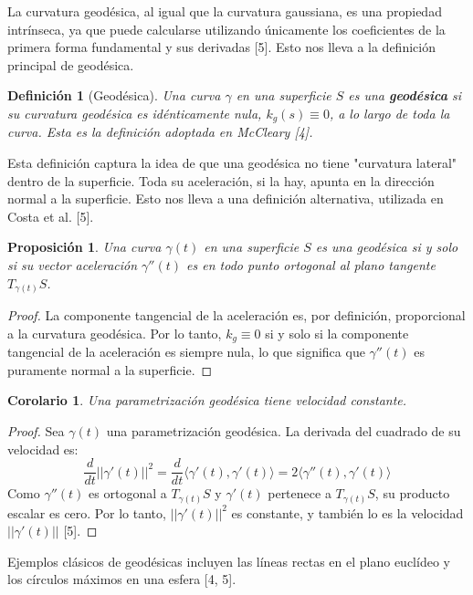 \documentclass[12pt, a4paper]{report}
\theoremstyle{miestilo}
\newtheorem{proposicion}[teorema]{Proposición}
\newtheorem{corolario}[teorema]{Corolario}
\theoremstyle{midefinicion}
\newtheorem{definicion}[teorema]{Definición}
\begin{document}
La curvatura geodésica, al igual que la curvatura gaussiana, es una propiedad intrínseca, ya que puede calcularse utilizando únicamente los coeficientes de la primera forma fundamental y sus derivadas [5]. Esto nos lleva a la definición principal de geodésica.

\begin{definicion}[Geodésica]
Una curva $\gamma$ en una superficie $S$ es una \textbf{geodésica} si su curvatura geodésica es idénticamente nula, $k_g(s) \equiv 0$, a lo largo de toda la curva. Esta es la definición adoptada en McCleary [4].
\end{definicion}

Esta definición captura la idea de que una geodésica no tiene "curvatura lateral" dentro de la superficie. Toda su aceleración, si la hay, apunta en la dirección normal a la superficie. Esto nos lleva a una definición alternativa, utilizada en Costa et al. [5].

\begin{proposicion}
Una curva $\gamma(t)$ en una superficie $S$ es una geodésica si y solo si su vector aceleración $\gamma''(t)$ es en todo punto ortogonal al plano tangente $T_{\gamma(t)}S$.
\end{proposicion}

\begin{proof}
La componente tangencial de la aceleración es, por definición, proporcional a la curvatura geodésica. Por lo tanto, $k_g \equiv 0$ si y solo si la componente tangencial de la aceleración es siempre nula, lo que significa que $\gamma''(t)$ es puramente normal a la superficie.
\end{proof}

\begin{corolario}
Una parametrización geodésica tiene velocidad constante.
\end{corolario}
\begin{proof}
Sea $\gamma(t)$ una parametrización geodésica. La derivada del cuadrado de su velocidad es:
$$ \frac{d}{dt} ||\gamma'(t)||^2 = \frac{d}{dt} \langle \gamma'(t), \gamma'(t) \rangle = 2 \langle \gamma''(t), \gamma'(t) \rangle $$
Como $\gamma''(t)$ es ortogonal a $T_{\gamma(t)}S$ y $\gamma'(t)$ pertenece a $T_{\gamma(t)}S$, su producto escalar es cero. Por lo tanto, $||\gamma'(t)||^2$ es constante, y también lo es la velocidad $||\gamma'(t)||$ [5].
\end{proof}

Ejemplos clásicos de geodésicas incluyen las líneas rectas en el plano euclídeo y los círculos máximos en una esfera [4, 5].
\end{document}
